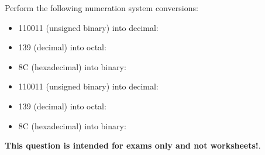 

Perform the following numeration system conversions:

\begin{itemize}
\item{} 110011 (unsigned binary) into decimal: \underbar{\hskip 50pt}
\vskip 10pt
\item{} 139 (decimal) into octal: \underbar{\hskip 50pt}
\vskip 10pt
\item{} 8C (hexadecimal) into binary: \underbar{\hskip 50pt}
\end{itemize}







\begin{itemize}
\item{} 110011 (unsigned binary) into decimal: 
\vskip 10pt
\item{} 139 (decimal) into octal: 
\vskip 10pt
\item{} 8C (hexadecimal) into binary: 
\end{itemize}







{\bf This question is intended for exams only and not worksheets!}.


